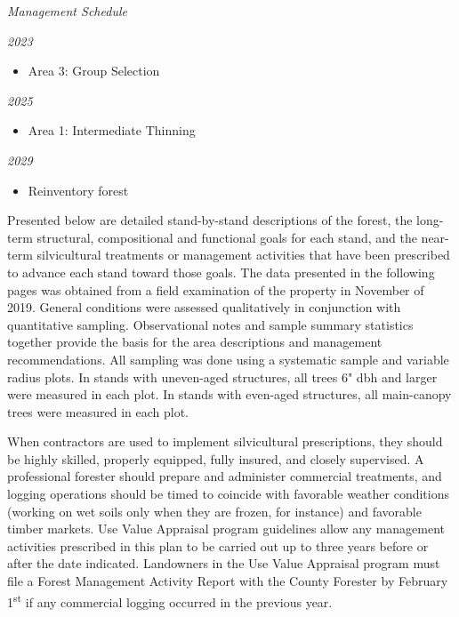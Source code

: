 \documentclass[]{tufte-handout}
\begin{document}
\begin{marginfigure} \noindent \textit{\LARGE Management Schedule} 

 \vspace{10 pt} 

 \noindent \textit{\large 2023} 

 \begin{itemize} \item Area 3: Group Selection 

 \end{itemize} \vspace{10 pt} 

 \noindent \textit{\large 2025} 

 \begin{itemize} \item Area 1: Intermediate Thinning 

 \end{itemize} \vspace{10 pt} 

 \noindent \textit{\large 2029} 

 \begin{itemize} \item Reinventory forest 

 \end{itemize} \end{marginfigure}

Presented below are detailed stand-by-stand descriptions of the forest,
the long-term structural, compositional and functional goals for each
stand, and the near-term silvicultural treatments or management
activities that have been prescribed to advance each stand toward those
goals. The data presented in the following pages was obtained from a
field examination of the property in November of 2019. General
conditions were assessed qualitatively in conjunction with quantitative
sampling. Observational notes and sample summary statistics together
provide the basis for the area descriptions and management
recommendations. All sampling was done using a systematic sample and
variable radius plots. In stands with uneven-aged structures, all trees
6" dbh and larger were measured in each plot. In stands with even-aged
structures, all main-canopy trees were measured in each plot.

When contractors are used to implement silvicultural prescriptions, they
should be highly skilled, properly equipped, fully insured, and closely
supervised. A professional forester should prepare and administer
commercial treatments, and logging operations should be timed to
coincide with favorable weather conditions (working on wet soils only
when they are frozen, for instance) and favorable timber markets. Use
Value Appraisal program guidelines allow any management activities
prescribed in this plan to be carried out up to three years before or
after the date indicated. Landowners in the Use Value Appraisal program
must file a Forest Management Activity Report with the County Forester
by February 1\textsuperscript{st} if any commercial logging occurred in
the previous year.
\end{document}
